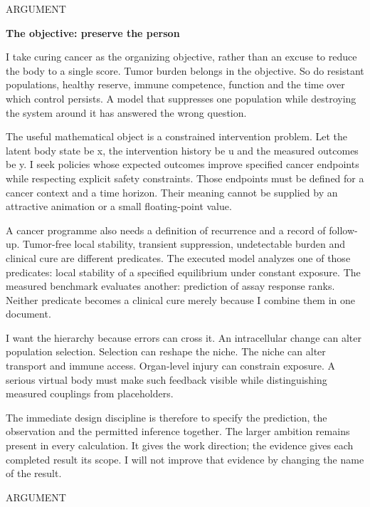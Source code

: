\documentclass[10pt]{article}
\begin{document}
\clearpage
\hypertarget{p4}{}
{\small\color{accent}\MakeUppercase{Argument}}\par
{\LARGE\bfseries\color{ink}The objective: preserve the person}\par\vspace{5pt}
I take curing cancer as the organizing objective, rather than an excuse to reduce the body to a single score. Tumor burden belongs in the objective. So do resistant populations, healthy reserve, immune competence, function and the time over which control persists. A model that suppresses one population while destroying the system around it has answered the wrong question.\par
The useful mathematical object is a constrained intervention problem. Let the latent body state be x, the intervention history be u and the measured outcomes be y. I seek policies whose expected outcomes improve specified cancer endpoints while respecting explicit safety constraints. Those endpoints must be defined for a cancer context and a time horizon. Their meaning cannot be supplied by an attractive animation or a small floating-point value.\par
A cancer programme also needs a definition of recurrence and a record of follow-up. Tumor-free local stability, transient suppression, undetectable burden and clinical cure are different predicates. The executed model analyzes one of those predicates: local stability of a specified equilibrium under constant exposure. The measured benchmark evaluates another: prediction of assay response ranks. Neither predicate becomes a clinical cure merely because I combine them in one document.\par
I want the hierarchy because errors can cross it. An intracellular change can alter population selection. Selection can reshape the niche. The niche can alter transport and immune access. Organ-level injury can constrain exposure. A serious virtual body must make such feedback visible while distinguishing measured couplings from placeholders.\par
The immediate design discipline is therefore to specify the prediction, the observation and the permitted inference together. The larger ambition remains present in every calculation. It gives the work direction; the evidence gives each completed result its scope. I will not improve that evidence by changing the name of the result.\par
\clearpage
\hypertarget{p5}{}
{\small\color{accent}\MakeUppercase{Argument}}\par
\end{document}
